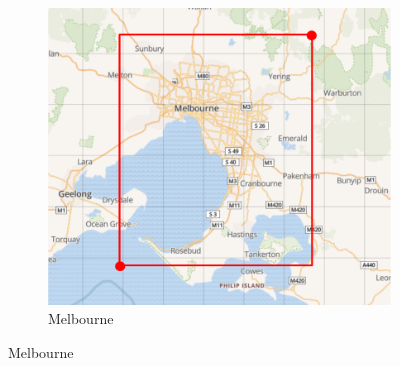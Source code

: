 \begin{figure}[t]
	\quad
	\begin{subfigure}[t]{0.3\textwidth}
		\centering
		\includegraphics[width=1\linewidth]{figures/melbourne_bb.png}
		\caption{Melbourne}
		\label{fig:melbourne_bounding_box}
	\end{subfigure}
	
	\medskip
	

\end{figure}
